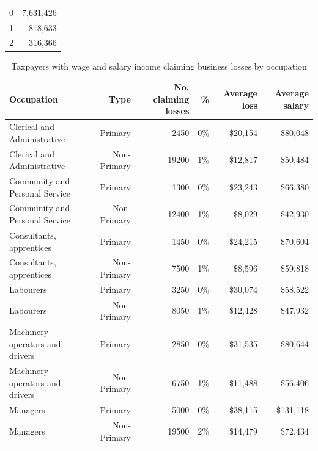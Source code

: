 \documentclass{grattan}\usepackage[]{graphicx}\usepackage[]{color}
\begin{document}
\begin{table}
\begin{tabularx}{\linewidth}{rr}
  \toprule
  \midrule
0 & 7,631,426 \\ 
  1 & 818,633 \\ 
  2 & 316,366 \\ 
   \bottomrule
\end{tabularx}

\end{table}

\begin{table}
\caption{Taxpayers with wage and salary income claiming business losses by occupation}\label{tbl:bizlosses}
\begin{tabularx}{\linewidth}{lrrrrr}
  \toprule
{\textbf{Occupation}} & {\textbf{Type}} & {\textbf{No. claiming losses}} & {\textbf{\%}} & {\textbf{Average loss}} & {\textbf{Average salary}} \\ 
  \midrule
Clerical and Administrative & Primary & 2450 & 0\% & \$20,154 & \$80,048 \\ 
  Clerical and Administrative & Non-Primary & 19200 & 1\% & \$12,817 & \$50,484 \\ 
   [6pt]Community and Personal Service & Primary & 1300 & 0\% & \$23,243 & \$66,380 \\ 
  Community and Personal Service & Non-Primary & 12400 & 1\% & \$8,029 & \$42,930 \\ 
   [6pt]Consultants, apprentices & Primary & 1450 & 0\% & \$24,215 & \$70,604 \\ 
  Consultants, apprentices & Non-Primary & 7500 & 1\% & \$8,596 & \$59,818 \\ 
   [6pt]Labourers & Primary & 3250 & 0\% & \$30,074 & \$58,522 \\ 
  Labourers & Non-Primary & 8050 & 1\% & \$12,428 & \$47,932 \\ 
   [6pt]Machinery operators and drivers & Primary & 2850 & 0\% & \$31,535 & \$80,644 \\ 
  Machinery operators and drivers & Non-Primary & 6750 & 1\% & \$11,488 & \$56,406 \\ 
   [6pt]Managers & Primary & 5000 & 0\% & \$38,115 & \$131,118 \\ 
  Managers & Non-Primary & 19500 & 2\% & \$14,479 & \$72,434 \\ 

\end{tabularx}
\end{table}
\end{document}
